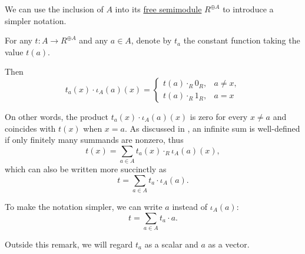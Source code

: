 \begin{remark}\label{rem:free_semimodule_notation}
  We can use the inclusion  of \( A \) into its \hyperref[def:free_semimodule]{free semimodule} \( R^{\oplus A} \) to introduce a simpler notation.

  For any \( t: A \to R^{\oplus A} \) and any \( a \in A \), denote by \( t_a \) the constant function taking the value \( t(a) \).

  Then
  \begin{equation*}
    t_a(x) \cdot \iota_A(a)(x)
    =
    \begin{cases}
      t(a) \cdot_R 0_R, &a \neq x, \\
      t(a) \cdot_R 1_R, &a = x
    \end{cases}
  \end{equation*}

  On other words, the product \( t_a(x) \cdot \iota_A(a)(x) \) is zero for every \( x \neq a \) and coincides with \( t(x) \) when \( x = a \).  As discussed in , an infinite sum is well-defined if only finitely many summands are nonzero, thus
  \begin{equation*}
    t(x) = \sum_{a \in A} t_a(x) \cdot_R \iota_A(a)(x),
  \end{equation*}
  which can also be written more succinctly as
  \begin{equation*}
    t = \sum_{a \in A} t_a \cdot \iota_A(a).
  \end{equation*}

  To make the notation simpler, we can write \( a \) instead of \( \iota_A(a) \):
  \begin{equation}\label{eq:def:free_semimodule/sum}
    t = \sum_{a \in A} t_a \cdot a.
  \end{equation}

  Outside this remark, we will regard \( t_a \) as a scalar and \( a \) as a vector.
\end{remark}

